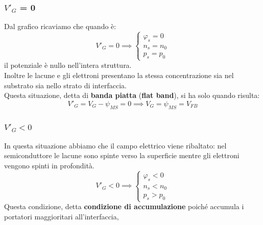 \documentclass{article}
\numberwithin{equation}{subsection}
\begin{document}
	\subsubsection{$V'_G$ = 0}
	Dal grafico ricaviamo che quando è:
	$$V'_G = 0 \implies \begin{cases} \varphi_s = 0 \\ n_s = n_0 \\ p_s = p_0 \end{cases}$$
	il potenziale è nullo nell’intera struttura.\\
	Inoltre le lacune e gli elettroni presentano la stessa concentrazione sia nel substrato sia nello strato di interfaccia.\\
	Questa situazione, detta di \textbf{banda piatta} (\textbf{flat band}), si ha solo quando risulta:
	$$V'_G = V_G - \psi_{MS} = 0 \implies V_G = \psi_{MS} = V_{FB}$$
	\subsubsection{$V'_G < 0$}
	In questa situazione abbiamo che il campo elettrico viene ribaltato: nel semiconduttore le lacune sono spinte verso la superficie mentre gli elettroni vengono spinti in profondità.
	$$V'_G < 0 \implies \begin{cases} \varphi_s < 0 \\ n_s < n_0 \\ p_s > p_0 \end{cases}$$
	Questa condizione, detta \textbf{condizione di accumulazione} poiché accumula i portatori maggioritari all’interfaccia,
\end{document}
